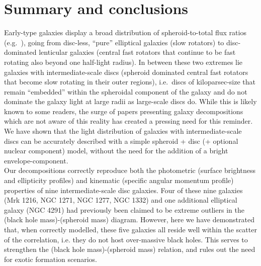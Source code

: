\documentclass[useAMS,usenatbib,article]{mnras}
\begin{document}
\section{Summary and conclusions}
Early-type galaxies display a broad distribution of spheroid-to-total flux ratios (e.g.~\citealt{cappellari2011kmdr}), 
going from disc-less, ``pure'' elliptical galaxies (slow rotators) 
to disc-dominated lenticular galaxies (central fast rotators that continue to be fast rotating also beyond one half-light radius). 
In between these two extremes lie galaxies with intermediate-scale discs 
(spheroid dominated central fast rotators that become slow rotating in their outer regions), 
i.e.~discs of kiloparsec-size that remain ``embedded'' within the spheroidal component of the galaxy 
and do not dominate the galaxy light at large radii as large-scale discs do. 
While this is likely known to some readers, 
the surge of papers presenting galaxy decompositions which are not aware of this reality 
has created a pressing need for this reminder. 
We have shown that the light distribution of galaxies with intermediate-scale discs can be accurately described 
with a simple spheroid + disc (+ optional nuclear component) model, 
without the need for the addition of a bright envelope-component. \\
Our decompositions correctly reproduce both the photometric (surface brightness and ellipticity profiles) 
and kinematic (specific angular momentum profile) properties of nine intermediate-scale disc galaxies. 
Four of these nine galaxies (Mrk 1216, NGC 1271, NGC 1277, NGC 1332) and one additional elliptical galaxy (NGC 4291) 
had previously been claimed to be extreme outliers in the (black hole mass)-(spheroid mass) diagram. 
However, here we have demonstrated that, when correctly modelled, 
these five galaxies all reside well within the scatter of the correlation, 
i.e. they do not host over-massive black holes. 
This serves to strengthen the (black hole mass)-(spheroid mass) relation, 
and rules out the need for exotic formation scenarios. 
\end{document}
